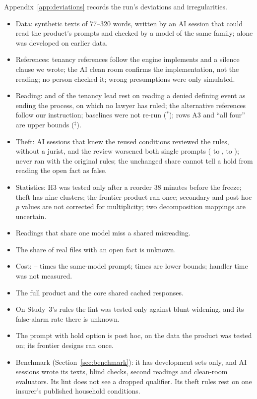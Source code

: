 Appendix~\ref{app:deviations} records the run's deviations and irregularities.
\begin{itemize}[leftmargin=1.2em,itemsep=1pt]
\item Data: synthetic texts of 77--320 words, written by an AI session that could read the product's prompts and checked by a model of the same family; \casepath alone was developed on earlier data.
\item References: tenancy references follow the engine \casepath implements and a silence clause we wrote; the AI clean room confirms the implementation, not the reading; no person checked it; wrong presumptions were only simulated.
\item Reading: \sthreeFLeadDeniedShareRic{} and \sthreeFLeadDeniedShareRicFrontier{} of the tenancy lead rest on reading a denied defining event as ending the process, on which no lawyer has ruled; the alternative references follow our instruction; baselines were not re-run ($^\ast$); rows A3 and ``all four'' are upper bounds ($^\ddagger$).
\item Theft: AI sessions that knew the reused conditions reviewed the rules, without a jurist, and the review worsened both single prompts (\sthreeRNineLunaErrOriginal{} to \sthreeRNineLunaErrReviewed, \sthreeRNineTerraErrOriginal{} to \sthreeRNineTerraErrReviewed); \casepath never ran with the original rules; the unchanged share cannot tell a hold from reading the open fact as false.
\item Statistics: H3 was tested only after a reorder 38 minutes before the freeze; theft has nine clusters; the frontier product ran once; secondary and post hoc $p$ values are not corrected for multiplicity; two decomposition mappings are uncertain.
\item Readings that share one model miss a shared misreading.
\item The share of real files with an open fact is unknown.
\item Cost: \sthreeFCostCasePathTenOverSameRound--\sthreeFCostCasePathThOverSameRound{} times the same-model prompt; times are lower bounds; handler time was not measured.
\item The full product and the core shared cached responses.
\item On Study~3's rules the lint was tested only against blunt widening, and its false-alarm rate there is unknown.
\item The prompt with hold option is post hoc, on the data the product was tested on; its frontier designs ran once.
\item Benchmark (Section~\ref{sec:benchmark}): it has development sets only, and AI sessions wrote its texts, blind checks, second readings and clean-room evaluators. Its lint does not see a dropped qualifier. Its theft rules rest on one insurer's published household conditions.
\end{itemize}
